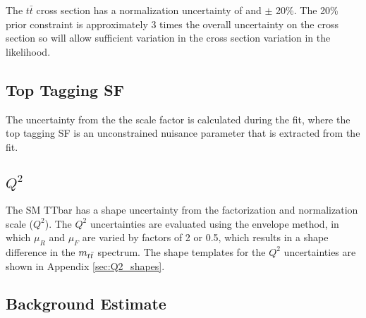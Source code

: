 The $t\bar{t}$ cross section has a normalization uncertainty of and $\pm$ 20\%. The 20\% prior constraint is approximately 3 times the overall uncertainty on the cross section so will allow sufficient variation in the cross section variation in the likelihood. 


\subsection{Top Tagging SF }

The uncertainty from the the scale factor is calculated during the fit, where the top tagging SF is an unconstrained nuisance parameter that is extracted from the fit.



\subsection{$Q^2$ }
The SM TTbar has a shape uncertainty from the factorization and normalization scale ($Q^2$). The $Q^2$ uncertainties are evaluated using the envelope method, in which $\mu_R$ and $\mu_F$ are varied by factors of 2 or 0.5, which results in a shape difference in the $m_{t\bar{t}}$ spectrum.  The shape templates for the $Q^2$ uncertainties are shown in Appendix \ref{sec:Q2_shapes}.







\subsection{Background Estimate} \label{section:BKGunc}

